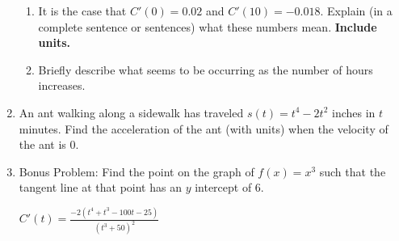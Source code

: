 \documentclass[11pt,fleqn]{article}
\begin{document}
\begin{enumerate}
\begin{enumerate}
	\item It is the case that $C'(0)=0.02$ and $C'(10)=-0.018.$ Explain (in a complete sentence or sentences) what these numbers mean. \textbf{Include units.}\\
	\vfill
	
	\item Briefly describe what seems to be occurring as the number of hours increases.
	\vfill
	\end{enumerate}
\item An ant walking along a sidewalk has traveled $s(t)=t^4-2t^2$ inches in $t$ minutes.  Find the acceleration of the ant (with units) when the velocity of the ant is 0.
\vfill
\item Bonus Problem: Find the point on the graph of $f(x)=x^3$  such that the tangent line at that point has an $y$ intercept of 6.

\hfill {\small{$C'(t)=\frac{-2(t^4+t^3-100t-25)}{(t^3+50)^2}$}}

\end{enumerate}
\end{document}
